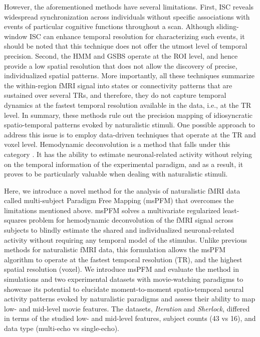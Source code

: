 However, the aforementioned methods have several limitations. First, ISC reveals
widespread synchronization across individuals without specific associations with
events of particular cognitive functions throughout a scan. Although
sliding-window ISC can enhance temporal resolution for characterizing such
events, it should be noted that this technique does not offer the utmost level
of temporal precision. Second, the HMM and GSBS operate at the ROI level, and
hence provide a low spatial resolution that does not allow the discovery of
precise, individualized spatial patterns. More importantly, all these techniques
summarize the within-region fMRI signal into states or connectivity patterns
that are sustained over several TRs, and therefore, they do not capture temporal
dynamics at the fastest temporal resolution available in the data, i.e., at the
TR level. In summary, these methods rule out the precision mapping
of idiosyncratic spatio-temporal patterns evoked by naturalistic stimuli. One
possible approach to address this issue is to employ data-driven techniques that
operate at the TR and voxel level. Hemodynamic deconvolution is a method that
falls under this category \citep{Gaudes2010Detectioncharacterizationsingle,
Karahanoglu2013TotalactivationfMRI,
Urunuela2023HemodynamicDeconvolutionDemystified}. It has the ability to estimate
neuronal-related activity without relying on the temporal information of the
experimental paradigm, and as a result, it proves to be particularly valuable
when dealing with naturalistic stimuli.

Here, we introduce a novel method for the analysis of naturalistic fMRI data
called multi-subject Paradigm Free Mapping (msPFM) that overcomes the limitations
mentioned above. msPFM solves a multivariate regularized least-squares problem
for hemodynamic deconvolution of the fMRI signal across subjects to blindly
estimate the shared and individualized neuronal-related activity without
requiring any temporal model of the stimulus. Unlike previous methods for
naturalistic fMRI data, this formulation allows the msPFM algorithm to operate
at the fastest temporal resolution (TR), and the highest spatial resolution
(voxel). We introduce msPFM and evaluate the method in simulations and two
experimental datasets with movie-watching paradigms to showcase its potential to
elucidate moment-to-moment spatio-temporal neural activity patterns evoked by
naturalistic paradigms and assess their ability to map low- and mid-level movie
features. The datasets, \textit{Iteration} and \textit{Sherlock}, differed in
terms of the studied low- and mid-level features, subject counts (43 vs 16), and
data type (multi-echo vs single-echo).


